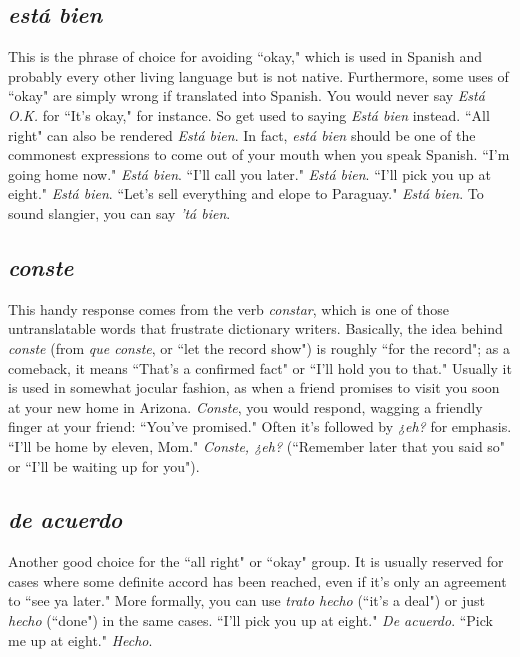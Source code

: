 \subsection{\emph{está bien}}

This is the phrase of choice for avoiding ``okay," which is used
in Spanish and probably every other living language but is not native.
Furthermore, some uses of ``okay" are simply wrong if translated into
Spanish. You would never say \emph{Está O.K.} for ``It's okay," for instance. So
get used to saying \emph{Está bien} instead. ``All right" can also be rendered
\emph{Está bien}. In fact, \emph{está bien} should be one of the commonest expressions to come out of your mouth when you speak Spanish. ``I'm going
home now." \emph{Está bien}. ``I'll call you later." \emph{Está bien}. ``I'll pick you up
at eight." \emph{Está bien}. ``Let's sell everything and elope to Paraguay." \emph{Está
	bien}. To sound slangier, you can say \emph{'tá bien}.

\subsection{\emph{conste}}

This handy response comes from the verb \emph{constar}, which is
one of those untranslatable words that frustrate dictionary writers.
Basically, the idea behind \emph{conste} (from \emph{que conste}, or ``let the record
show") is roughly ``for the record"; as a comeback, it means ``That's a
confirmed fact" or ``I'll hold you to that." Usually it is used in somewhat jocular fashion, as when a friend promises to visit you soon at
your new home in Arizona. \emph{Conste}, you would respond, wagging a
friendly finger at your friend: ``You've promised." Often it's followed
by \emph{¿eh?} for emphasis. ``I'll be home by eleven, Mom." \emph{Conste, ¿eh?}
(``Remember later that you said so" or ``I'll be waiting up for you").

\subsection{\emph{de acuerdo}}

Another good choice for the ``all right" or ``okay" group. It
is usually reserved for cases where some definite accord has been
reached, even if it's only an agreement to ``see ya later." More formally,
you can use \emph{trato hecho} (``it's a deal") or just \emph{hecho} (``done") in the
same cases. ``I'll pick you up at eight." \emph{De acuerdo}. ``Pick me up at
eight." \emph{Hecho}.

